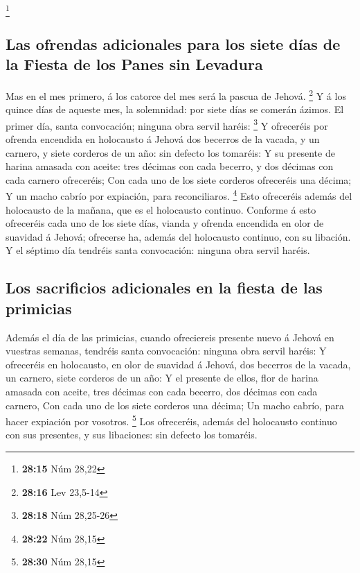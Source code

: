 \footnote{\textbf{28:15} Núm 28,22}

\hypertarget{las-ofrendas-adicionales-para-los-siete-duxedas-de-la-fiesta-de-los-panes-sin-levadura}{%
\subsection{Las ofrendas adicionales para los siete días de la Fiesta de
los Panes sin
Levadura}\label{las-ofrendas-adicionales-para-los-siete-duxedas-de-la-fiesta-de-los-panes-sin-levadura}}

 Mas en el mes primero, á los catorce del mes será la
pascua de Jehová. \footnote{\textbf{28:16} Lev 23,5-14} 
Y á los quince días de aqueste mes, la solemnidad: por siete días se
comerán ázimos.  El primer día, santa convocación;
ninguna obra servil haréis: \footnote{\textbf{28:18} Núm 28,25-26}
 Y ofreceréis por ofrenda encendida en holocausto á
Jehová dos becerros de la vacada, y un carnero, y siete corderos de un
año: sin defecto los tomaréis:  Y su presente de harina
amasada con aceite: tres décimas con cada becerro, y dos décimas con
cada carnero ofreceréis;  Con cada uno de los siete
corderos ofreceréis una décima;  Y un macho cabrío por
expiación, para reconciliaros. \footnote{\textbf{28:22} Núm 28,15}
 Esto ofreceréis además del holocausto de la mañana, que
es el holocausto continuo.  Conforme á esto ofreceréis
cada uno de los siete días, vianda y ofrenda encendida en olor de
suavidad á Jehová; ofrecerse ha, además del holocausto continuo, con su
libación.  Y el séptimo día tendréis santa convocación:
ninguna obra servil haréis.

\hypertarget{los-sacrificios-adicionales-en-la-fiesta-de-las-primicias}{%
\subsection{Los sacrificios adicionales en la fiesta de las
primicias}\label{los-sacrificios-adicionales-en-la-fiesta-de-las-primicias}}

 Además el día de las primicias, cuando ofreciereis
presente nuevo á Jehová en vuestras semanas, tendréis santa convocación:
ninguna obra servil haréis:  Y ofreceréis en holocausto,
en olor de suavidad á Jehová, dos becerros de la vacada, un carnero,
siete corderos de un año:  Y el presente de ellos, flor
de harina amasada con aceite, tres décimas con cada becerro, dos décimas
con cada carnero,  Con cada uno de los siete corderos una
décima;  Un macho cabrío, para hacer expiación por
vosotros. \footnote{\textbf{28:30} Núm 28,15}  Los
ofreceréis, además del holocausto continuo con sus presentes, y sus
libaciones: sin defecto los tomaréis.

